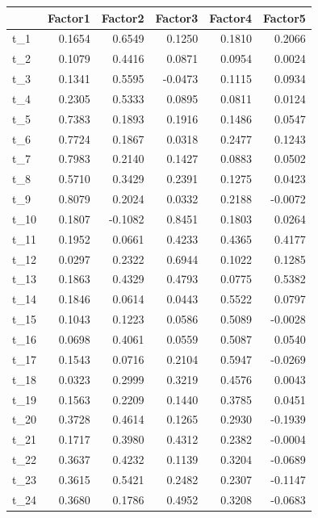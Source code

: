 \documentclass[
]{article}
\theoremstyle{plain}
\begin{document}
\smallskip

\begin{longtable}[]{@{}lrrrrr@{}}
\toprule\noalign{}
& Factor1 & Factor2 & Factor3 & Factor4 & Factor5 \\
\midrule\noalign{}
\endhead
\bottomrule\noalign{}
\endlastfoot
t\_1 & 0.1654 & 0.6549 & 0.1250 & 0.1810 & 0.2066 \\
t\_2 & 0.1079 & 0.4416 & 0.0871 & 0.0954 & 0.0024 \\
t\_3 & 0.1341 & 0.5595 & -0.0473 & 0.1115 & 0.0934 \\
t\_4 & 0.2305 & 0.5333 & 0.0895 & 0.0811 & 0.0124 \\
t\_5 & 0.7383 & 0.1893 & 0.1916 & 0.1486 & 0.0547 \\
t\_6 & 0.7724 & 0.1867 & 0.0318 & 0.2477 & 0.1243 \\
t\_7 & 0.7983 & 0.2140 & 0.1427 & 0.0883 & 0.0502 \\
t\_8 & 0.5710 & 0.3429 & 0.2391 & 0.1275 & 0.0423 \\
t\_9 & 0.8079 & 0.2024 & 0.0332 & 0.2188 & -0.0072 \\
t\_10 & 0.1807 & -0.1082 & 0.8451 & 0.1803 & 0.0264 \\
t\_11 & 0.1952 & 0.0661 & 0.4233 & 0.4365 & 0.4177 \\
t\_12 & 0.0297 & 0.2322 & 0.6944 & 0.1022 & 0.1285 \\
t\_13 & 0.1863 & 0.4329 & 0.4793 & 0.0775 & 0.5382 \\
t\_14 & 0.1846 & 0.0614 & 0.0443 & 0.5522 & 0.0797 \\
t\_15 & 0.1043 & 0.1223 & 0.0586 & 0.5089 & -0.0028 \\
t\_16 & 0.0698 & 0.4061 & 0.0559 & 0.5087 & 0.0540 \\
t\_17 & 0.1543 & 0.0716 & 0.2104 & 0.5947 & -0.0269 \\
t\_18 & 0.0323 & 0.2999 & 0.3219 & 0.4576 & 0.0043 \\
t\_19 & 0.1563 & 0.2209 & 0.1440 & 0.3785 & 0.0451 \\
t\_20 & 0.3728 & 0.4614 & 0.1265 & 0.2930 & -0.1939 \\
t\_21 & 0.1717 & 0.3980 & 0.4312 & 0.2382 & -0.0004 \\
t\_22 & 0.3637 & 0.4232 & 0.1139 & 0.3204 & -0.0689 \\
t\_23 & 0.3615 & 0.5421 & 0.2482 & 0.2307 & -0.1147 \\
t\_24 & 0.3680 & 0.1786 & 0.4952 & 0.3208 & -0.0683 \\
\end{longtable}
\end{document}
